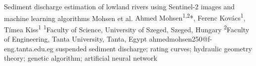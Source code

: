 \abstract
{Sediment discharge estimation of lowland rivers using Sentinel-2 images and machine learning algorithms} 
{Mohsen et al.} 
{Ahmed Mohsen\textsuperscript{1,2}*, Ferenc Kovács\textsuperscript{1}, Tímea Kiss\textsuperscript{1}} 
{\TLtag} 
{
\textsuperscript{1}Faculty of Science, University of Szeged, Szeged, Hungary 
\textsuperscript{2}Faculty of Engineering, Tanta University, Tanta, Egypt
}
{ahmed\textunderscore mohsen250@f-eng.tanta.edu.eg}  %
{suspended sediment discharge; rating curves; hydraulic geometry theory; genetic algorithm; artificial neural network}

